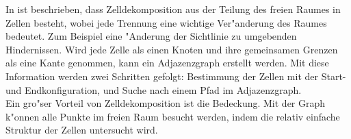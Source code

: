 In \cite{Principles:05} ist beschrieben, dass Zelldekomposition aus der Teilung des freien Raumes in Zellen besteht, wobei jede Trennung eine wichtige Ver"anderung des Raumes bedeutet. Zum Beispiel eine "Anderung der Sichtlinie zu umgebenden Hindernissen. Wird jede Zelle als einen Knoten und ihre gemeinsamen Grenzen als eine Kante genommen, kann ein Adjazenzgraph erstellt werden. 
Mit diese Information werden zwei Schritten gefolgt: Bestimmung der Zellen mit der Start- und Endkonfiguration, und Suche nach einem Pfad im Adjazenzgraph.\\
Ein gro{"s}er Vorteil von Zelldekomposition ist die Bedeckung. Mit der Graph k"onnen alle Punkte im freien Raum besucht werden, indem die relativ einfache Struktur der Zellen untersucht wird.

